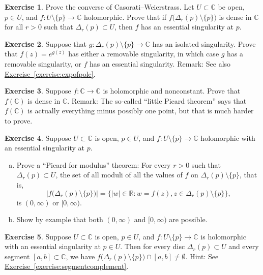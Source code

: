 \documentclass[12pt,openany]{book}
\newcommand{\sabs}[1]{\lvert {#1} \rvert}
\newcommand{\abs}[1]{\left\lvert {#1} \right\rvert}
\newcommand{\C}{{\mathbb{C}}}
\newcommand{\R}{{\mathbb{R}}}
\newcommand{\myquote}[1]{``#1''}
\theoremstyle{plain}
\theoremstyle{remark}
\theoremstyle{definition}
\newenvironment{exbox}{%
    \def\FrameCommand{\vrule width 1pt \relax\hspace{10pt}}%
    \MakeFramed{\advance\hsize-\width\FrameRestore}%
}{%
    \endMakeFramed
}
\newenvironment{exparts}{%
    \leavevmode\begin{enumerate}[a),noitemsep,topsep=0pt,parsep=0pt,partopsep=0pt]
}{%
    \end{enumerate}
}
\theoremstyle{exercise}
\newtheorem{exercise}{Exercise}[section]
\theoremstyle{example}
\newcommand{\exerciseref}[1]{\hyperref[#1]{Exercise~\ref*{#1}}}
\begin{document}
\begin{exbox}
\begin{exercise}
Prove the converse of Casorati--Weierstrass.
Let $U \subset \C$ be open, $p \in U$, and
$f \colon U \setminus \{ p \} \to \C$
holomorphic.
Prove that if $f\bigl(\Delta_r(p) \setminus \{ p \} \bigr)$ is dense in $\C$
for all $r > 0$ such that $\Delta_r(p) \subset U$,
then $f$ has an essential singularity at $p$.
\end{exercise}

\begin{exercise}%
\label{exercise:singofexp}
Suppose that $g \colon \Delta_r(p) \setminus \{ p \} \to \C$
has an isolated singularity.  Prove that $f(z) = e^{g(z)}$
has either a removable singularity, in which case $g$
has a removable singularity, or $f$ has an essential singularity.
Remark: See also \exerciseref{exercise:expofpole}.
\end{exercise}

\begin{exercise}
Suppose $f \colon \C \to \C$ is holomorphic and nonconstant.
Prove that $f(\C)$ is dense in $\C$.
Remark: The so-called \myquote{little Picard theorem} says that $f(\C)$
is actually everything minus possibly one point,
but that is much harder to prove.
\end{exercise}

\begin{exercise}
Suppose $U \subset \C$ is open, $p \in U$, and $f \colon U \setminus \{ p \} \to \C$
holomorphic with an essential singularity at $p$.
\begin{exparts}
\item
Prove a \myquote{Picard for modulus} theorem:
For every $r > 0$ such that
$\Delta_r(p) \subset U$, the set
of all moduli of all the values of $f$ on $\Delta_r(p) \setminus \{ p \}$,
that is,
\begin{equation*}
\abs{f\bigl(\Delta_r(p) \setminus \{ p \} \bigr)}
=
\bigl\{ \sabs{w} \in \R : w = f(z), z \in \Delta_r(p) \setminus \{ p \}
\bigr\},
\end{equation*}
is $(0,\infty)$ or $[0,\infty)$.
\item
Show by example that both $(0,\infty)$ and $[0,\infty)$ are possible.
\end{exparts}
\end{exercise}

\begin{exercise}
Suppose $U \subset \C$ is open, $p \in U$, and $f \colon U \setminus \{ p \} \to \C$ is
holomorphic with
an essential singularity at $p \in U$.  Then for every disc
$\Delta_r(p) \subset U$ and every segment $[a,b] \subset
\C$, we have
$f\bigl(\Delta_r(p) \setminus \{ p \} \bigr) \cap [a,b] \not= \emptyset$.
Hint: See 
\exerciseref{exercise:segmentcomplement}.
\end{exercise}
\end{exbox}
\end{document}
